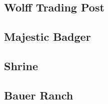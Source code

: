 

\subsection{Wolff Trading Post}


\subsection{Majestic Badger}


\subsection{Shrine}


\subsection{Bauer Ranch}

